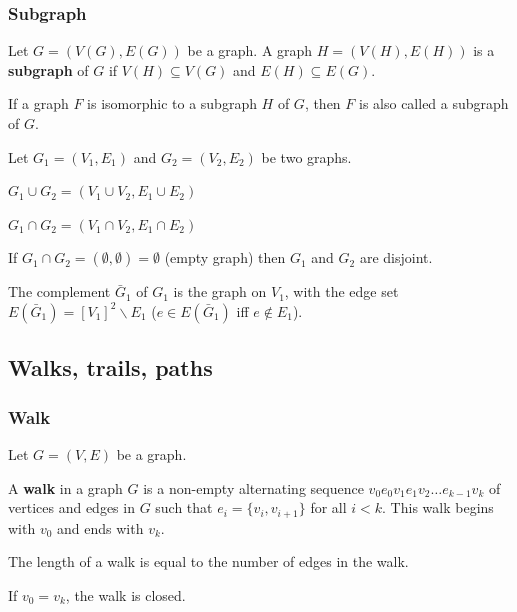 \documentclass[aspectratio=169]{beamer}
\begin{document}
\begin{frame}\frametitle{Subgraph}
\begin{definition}[Subgraph]
Let $G=(V(G),E(G))$ be a graph.
A graph $H=(V(H),E(H))$ is a \textbf{subgraph} of $G$ if $V(H)\subseteq V(G)$ and $E(H)\subseteq E(G)$.
\end{definition}
\begin{definition}
If a graph $F$ is isomorphic to a subgraph $H$ of $G$, then $F$ is also called a subgraph of $G$.
\end{definition}
\end{frame}


\begin{frame}
Let $G_1=(V_1,E_1)$ and $G_2=(V_2,E_2)$ be two graphs.
\begin{definition}
$G_1\cup G_2=(V_1\cup V_2,E_1\cup E_2)$
\end{definition}
\begin{definition}
$G_1\cap G_2=(V_1\cap V_2,E_1\cap E_2)$
\end{definition}
\begin{definition}
If $G_1\cap G_2=(\emptyset,\emptyset)= \emptyset$ (empty graph) then $G_1$ and $G_2$ are disjoint.
\end{definition}
\begin{definition}[{Complement of $G_1$}]
The complement $\bar G_1$ of $G_1$ is the graph on $V_1$, with the edge set $E(\bar G_1)=[V_1]^2\backslash E_1$ ($e\in E(\bar G_1)$ iff $e\not \in E_1$).
\end{definition}
\end{frame}


\subsection{Walks, trails, paths}


\begin{frame}\frametitle{Walk}
Let $G=(V,E)$ be a graph.
\begin{definition}[{Walk}]
A \textbf{walk} in a graph $G$ is a non-empty alternating sequence $v_0 e_0 v_1 e_1 v_2 \dots e_{k-1} v_k$ of vertices and edges in $G$ such that $e_i=\{v_i, v_{i+1}\}$ for all $i<k$. 
This walk begins with $v_0$ and ends with $v_k$.
\end{definition}
\begin{definition}
The length of a walk is equal to the number of edges in the walk.
\end{definition}
\begin{definition}
If $v_0=v_k$, the walk is closed.
\end{definition}
\end{frame}
\end{document}
